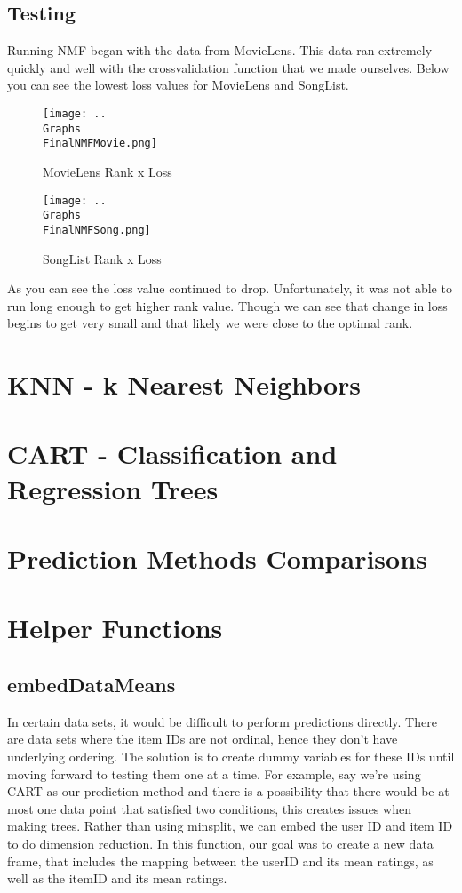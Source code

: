 \documentclass{article}
\begin{document}
\subsection{Testing}
Running NMF began with the data from MovieLens. This data ran extremely quickly and well with the crossvalidation function that we made ourselves. Below you can see the lowest loss values for MovieLens and SongList.

\begin{figure}
  \texttt{[image: ..\\Graphs\\FinalNMFMovie.png]}
  \caption{MovieLens Rank x Loss}
\end{figure}

\begin{figure}
  \texttt{[image: ..\\Graphs\\FinalNMFSong.png]}
  \caption{SongList Rank x Loss}
\end{figure}


As you can see the loss value continued to drop. Unfortunately, it was not able to run long enough to get higher rank value. Though we can see that change in loss begins to get very small and that likely we were close to the optimal rank.


\section{KNN - k Nearest Neighbors}

\section{CART - Classification and Regression Trees}

\section{Prediction Methods Comparisons}

\section{Helper Functions}
\subsection{embedDataMeans}
In certain data sets, it would be difficult to perform predictions directly. There are data sets where the item IDs are not ordinal, hence they don't have underlying ordering. The solution is to create dummy variables for these IDs until moving forward to testing them one at a time. 
For example, say we're using CART as our prediction method and there is a possibility that there would be at most one data point that satisfied two conditions, this creates issues when making trees. Rather than using minsplit, we can embed the user ID and item ID to do dimension reduction. In this function, our goal was to create a new data frame, that includes the mapping between the userID and its mean ratings, as well as the itemID and its mean ratings. 
\end{document}
